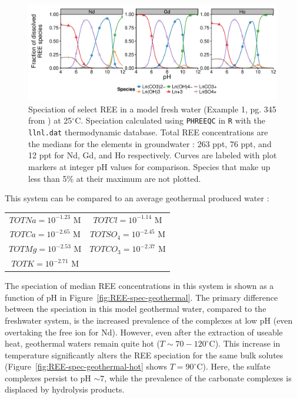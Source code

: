 \begin{figure}[htbp]
\begin{center}
\includegraphics[width = \textwidth]{REE-aq-chem-figs/REE-spec-MH-freshwater-horiz.pdf}
\caption[Speciation of select REE in a model fresh water at 25$^\circ$C.]{Speciation of select REE in a model fresh water (Example 1, pg. 345 from \citet{Morel_Hering}) at 25$^\circ$C.
Speciation calculated using \texttt{PHREEQC} \citep{PHREEQC} in \texttt{R} \citep{R} with the \texttt{llnl.dat} thermodynamic database.
Total REE concentrations are the medians for the elements in groundwater \citep{Noack_EST_2014}: 263 ppt, 76 ppt, and 12 ppt for Nd, Gd, and Ho respectively.
Curves are labeled with plot markers at integer pH values for comparison.
Species that make up less than 5\% at their maximum are not plotted.}
\label{fig:REE-spec-fresh}
\end{center}
\end{figure}

This system can be compared to an average geothermal produced water \citep[average values from ][]{ProdWat}:
\begin{center}
\begin{tabular}{cc}
$TOTNa = 10^{-1.23}\text{ M}$ & $TOTCl = 10^{-1.14}\text{ M}$\\
$TOTCa = 10^{-2.65}\text{ M}$ & $TOTSO_4 = 10^{-2.45}\text{ M}$\\
$TOTMg = 10^{-2.53}\text{ M}$ & $TOTCO_3 = 10^{-2.37}\text{ M}$\\
$TOTK = 10^{-2.71}\text{ M}$ &  \\
\end{tabular}
\end{center}
The speciation of median REE concentrations in this system is shown as a function of pH in Figure~\ref{fig:REE-spec-geothermal}.
The primary difference between the speciation in this model geothermal water, compared to the freshwater system, is the increased prevalence of the  complexes at low pH (even overtaking the free ion for Nd).
However, even after the extraction of useable heat, geothermal waters remain quite hot ($T \sim 70-120^\circ$C).
This increase in temperature significantly alters the REE speciation for the same bulk solutes (Figure~\ref{fig:REE-spec-geothermal-hot} shows $T=90^\circ$C).
Here, the sulfate complexes persist to pH $\sim 7$, while the prevalence of the carbonate complexes is displaced by hydrolysis products.

